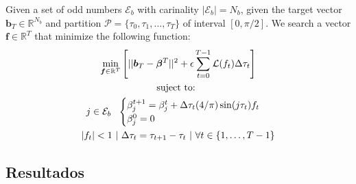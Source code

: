 \begin{problem}
    Given  a set of odd numbers $\mathcal{E}_b$ with carinality $|\mathcal{E}_b| = N_b$, given the target vector $\bm{b}_T  \in \mathbb{R}^{N_b}$ and  partition $\mathcal{P} = \{\tau_0,\tau_1,\dots,\tau_{T}\}$ of interval $[0,\pi/2]$. We search a vector $\bm{f} \in \mathbb{R}^{T}$ that minimize the following function:
    \begin{gather}
        \min_{\bm{f} \in \mathbb{R}^{T} } 
        \Bigg[ || \bm{b}_T - \bm{\beta}^{T}||^2 +
         \epsilon  \sum_{t=0}^{T-1} \mathcal{L}(f_{t}) \Delta\tau_t  \Bigg]  \\
        \notag \text{suject to: } \\
        \notag j \in \mathcal{E}_b \ \ 
        \begin{cases}
            \beta_j^{t+1} = \beta_j^{t} + \Delta \tau_t (4/\pi) \sin(j\tau_t) f_t \\
            \beta_j^0 = 0
        \end{cases} \\
        \notag |f_t| < 1 \  | \   \Delta \tau_t = \tau_{t+1} - \tau_{t} \ | \ \forall t \in \{1,\dots,T-1\}
    \end{gather}
\end{problem}

\subsection{Resultados}

